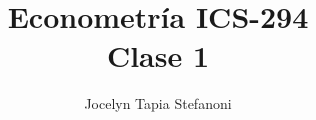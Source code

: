 \documentclass[10pt]{beamer}
\title[ICS-162]{Econometría ICS-294\\ \small{Clase 1}}
\author{Jocelyn Tapia Stefanoni}
\institute[USM]
{Universidad Técnica Federico Santa María\\ %
	\medskip
	\textit{} %
	
}
\date{}
\begin{document}
	
\begin{frame}
	\titlepage %
\end{frame}
\end{document}
